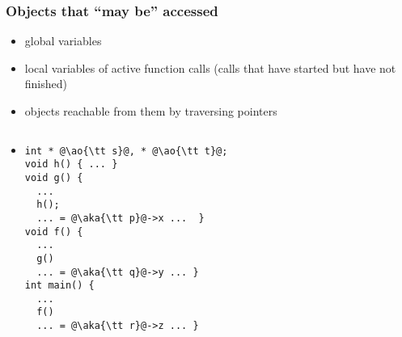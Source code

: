 \documentclass[12pt,dvipdfmx]{beamer}
\newif\ifja
\newif\ifeng
\newcommand{\ore}[1]{{\color{orange}#1}}
\newcommand{\ao}[1]{{\color{blue}#1}}
\newcommand{\aka}[1]{{\color{red}#1}}
\begin{document}
\begin{frame}[fragile]
\frametitle{Objects that ``may be'' accessed}
{\small
\begin{itemize}
\item \ao{global variables}
\item \aka{local variables} of
  active function calls (calls that have started but have not finished)
\item<2->\ore{objects reachable from them by traversing pointers}
\end{itemize}}

\begin{columns}
\begin{column}{0.35\textwidth}
  \begin{itemize}
  \item []
\begin{lstlisting}[]
int * @\ao{\tt s}@, * @\ao{\tt t}@;
void h() { ... }
void g() {
  ... 
  h();
  ... = @\aka{\tt p}@->x ...  }
void f() {
  ... 
  g()
  ... = @\aka{\tt q}@->y ... }
int main() {
  ... 
  f()
  ... = @\aka{\tt r}@->z ... }
\end{lstlisting}
\end{itemize}
\end{column}

\begin{column}{0.65\textwidth}
\begin{center}
%
\end{center}
\end{column}
\end{columns}
\end{frame}
\fi

\ifja
\subsection{基本原理と用語}
\fi
\ifeng
\end{document}
